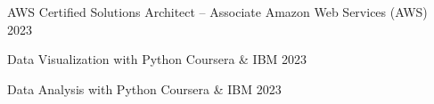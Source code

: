 

\begin{cvhonors}

  \cvhonor
    {AWS Certified Solutions Architect – Associate} %
    {Amazon Web Services (AWS)} %
    {} %
    {2023} %

  \cvhonor
    {Data Visualization with Python} %
    {Coursera \& IBM} %
    {} %
    {2023} %

  \cvhonor
    {Data Analysis with Python} %
    {Coursera \& IBM} %
    {} %
    {2023} %

\end{cvhonors}